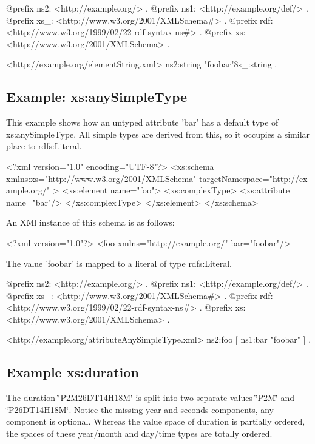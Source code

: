 \begin{DoxyCodeInclude}
@prefix ns2:     <http://example.org/> .
@prefix ns1:     <http://example.org/def/> .
@prefix xs_:     <http://www.w3.org/2001/XMLSchema#> .
@prefix rdf:     <http://www.w3.org/1999/02/22-rdf-syntax-ns#> .
@prefix xs:      <http://www.w3.org/2001/XMLSchema> .

<http://example.org/elementString.xml>
      ns2:string "foobar"^^xs_:string .
\end{DoxyCodeInclude}
 \hypertarget{attributeAnySimpleType}{}\subsection{Example: xs:anySimpleType}\label{attributeAnySimpleType}
This example shows how an untyped attribute 'bar' has a default type of xs:anySimpleType. All simple types are derived from this, so it occupies a similar place to rdfs:Literal.


\begin{DoxyCodeInclude}
<?xml version="1.0" encoding="UTF-8"?>
<xs:schema xmlns:xs="http://www.w3.org/2001/XMLSchema" targetNamespace="http://ex
      ample.org/" >   
        <xs:element name="foo">
                <xs:complexType>
                        <xs:attribute name="bar"/>
                </xs:complexType>       
        </xs:element>
</xs:schema>
\end{DoxyCodeInclude}


An XMl instance of this schema is as follows:


\begin{DoxyCodeInclude}
<?xml version="1.0"?>
<foo xmlns="http://example.org/" bar="foobar"/>
\end{DoxyCodeInclude}


The value 'foobar' is mapped to a literal of type rdfs:Literal.


\begin{DoxyCodeInclude}
@prefix ns2:     <http://example.org/> .
@prefix ns1:     <http://example.org/def/> .
@prefix xs_:     <http://www.w3.org/2001/XMLSchema#> .
@prefix rdf:     <http://www.w3.org/1999/02/22-rdf-syntax-ns#> .
@prefix xs:      <http://www.w3.org/2001/XMLSchema> .

<http://example.org/attributeAnySimpleType.xml>
      ns2:foo [ ns1:bar "foobar"
              ] .
\end{DoxyCodeInclude}
 \hypertarget{elementDuration}{}\subsection{Example xs:duration}\label{elementDuration}
The duration \char`\"{}P2M26DT14H18M\char`\"{} is split into two separate values \char`\"{}P2M\char`\"{} and \char`\"{}P26DT14H18M\char`\"{}. Notice the missing year and seconds components, any component is optional. Whereas the value space of duration is partially ordered, the spaces of these year/month and day/time types are totally ordered.


